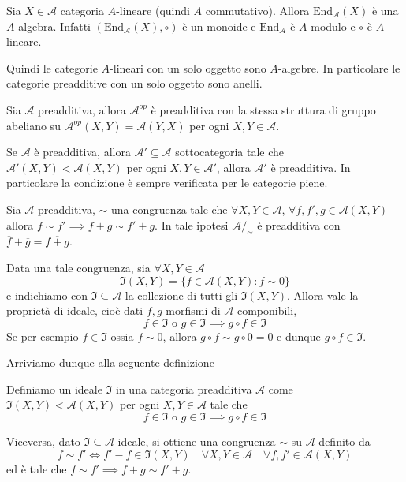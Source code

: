 \begin{remark}{}
    Sia \(X \in \mathcal{A}\) categoria \(A\)-lineare (quindi \(A\)
    commutativo). Allora \(\mathrm{End}_\mathcal{A}{(X)}\) è una \(A\)-algebra.
    Infatti \({(\mathrm{End}_{\mathcal{A}} {(X)}, \circ)}\) è un monoide e \(\mathrm{End}_\mathcal{A}\) è \(A\)-modulo e \(\circ\) è \(A\)-lineare.

    Quindi le categorie \(A\)-lineari con un solo oggetto sono \(A\)-algebre. In
    particolare le categorie preadditive con un solo oggetto sono anelli.
\end{remark}

\begin{remark}{}
Sia \(\mathcal{A}\) preadditiva, allora \(\mathcal{A}^{op}\) è preadditiva con
la stessa struttura di gruppo abeliano su \(\mathcal{A}^{op}{(X, Y)} = \mathcal{A}{(Y, X)}\) per ogni \(X, Y \in \mathcal{A}\).
\end{remark}

\begin{remark}{}
Se \(\mathcal{A}\) è preadditiva, allora \(\mathcal{A}' \subseteq \mathcal{A}\) sottocategoria tale che \(\mathcal{A}'{(X, Y)} < \mathcal{A}{(X,Y)}\) per ogni \(X, Y \in \mathcal{A}'\), allora \(\mathcal{A}'\) è preadditiva. In particolare la condizione è sempre verificata per le categorie piene.
\end{remark}

    Sia \(\mathcal{A}\) preadditiva, \(\sim \) una congruenza tale che \(\forall X, Y \in \mathcal{A}\), \(\forall f, f', g \in \mathcal{A}{(X, Y)}\) allora \(f \sim f' \implies f + g \sim f' + g\). In tale ipotesi \(\mathcal{A}/_\sim \) è preadditiva con \(\overline{f} + \overline{g} = \overline{f+g}\).

    Data una tale congruenza, sia \(\forall X, Y \in \mathcal{A}\) 
    \[
      \mathfrak{I}{(X,Y)} = \{f \in \mathcal{A}{(X, Y)} : f \sim 0\} 
    \]
    e indichiamo con \(\mathfrak{I} \subseteq \mathcal{A}\) la collezione di
    tutti gli \(\mathfrak{I}{(X, Y)}\). Allora vale la proprietà di ideale, cioè
    dati \(f, g\) morfismi di \(\mathcal{A}\) componibili, 
    \[
      f \in  \mathfrak{I} \text{ o } g \in \mathfrak{I} \implies g \circ f \in \mathfrak{I}
    \]
    Se per esempio \(f \in \mathfrak{I}\) ossia \(f \sim 0\), allora \(g \circ f
    \sim g \circ 0 = 0 \) e dunque \(g \circ f \in \mathfrak{I}\).

    Arriviamo dunque alla seguente definizione

\begin{definition}{}
    Definiamo un ideale \(\mathfrak{I}\) in una categoria preadditiva \(\mathcal{A}\) come \(\mathfrak{I}{(X,Y)} < \mathcal{A}{(X,Y)}\) per ogni \(X, Y \in \mathcal{A}\) tale che
    \[
      f \in \mathfrak{I} \text{ o } g \in \mathfrak{I} \implies g \circ f \in
      \mathfrak{I}
    \]
\end{definition}
Viceversa, dato \(\mathfrak{I} \subseteq \mathcal{A} \) ideale, si ottiene una
congruenza \(\sim \) su \(\mathcal{A}\) definito da 
\[
  f \sim f' \iff f' - f \in \mathfrak{I}{(X, Y)} \quad \forall X, Y \in \mathcal{A} \quad \forall f, f' \in  \mathcal{A}{(X, Y)}
\]
ed è tale che \(f \sim f' \implies f + g \sim f'+ g\).

